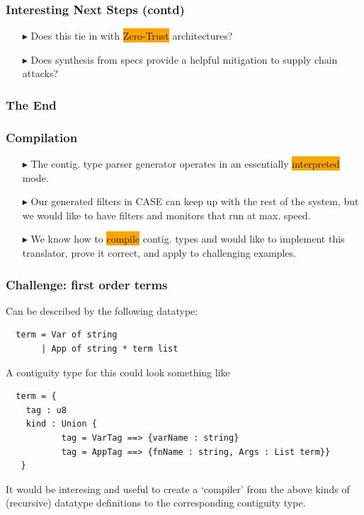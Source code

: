 \documentclass{beamer}
\newcommand{\kemph}[1]{\colorbox{orange}{#1}}
\begin{document}
\begin{frame} \frametitle{Interesting Next Steps (contd)}

\begin{itemize}
\item [$\blacktriangleright$] Does this tie in with \kemph{Zero-Trust} architectures?

\item [$\blacktriangleright$]
  Does synthesis from specs provide a helpful mitigation to supply chain attacks?

\end{itemize}

\end{frame}

\begin{frame}\frametitle{The End}\end{frame}


\begin{frame} \frametitle{Compilation}

\begin{itemize}

\item [$\blacktriangleright$] The contig. type parser generator
  operates in an essentially \kemph{interpreted} mode.

\item [$\blacktriangleright$] Our generated filters in CASE can keep
  up with the rest of the system, but we would like to have filters
  and monitors that run at max. speed.

\item [$\blacktriangleright$] We know how to \kemph{compile}
  contig. types and would like to implement this translator, prove
  it correct, and apply to challenging examples.

\end{itemize}

\end{frame}


\begin{frame}[fragile]\frametitle{Challenge: first order terms}

Can be described by the following datatype:

{\small
\begin{verbatim}
  term = Var of string
       | App of string * term list
\end{verbatim}}

A contiguity type for this could look something like
%
{\small
\begin{verbatim}
  term = {
    tag : u8
    kind : Union {
           tag = VarTag ==> {varName : string}
           tag = AppTag ==> {fnName : string, Args : List term}}
   }
\end{verbatim}}

It would be interesing and useful to create a `compiler' from the
above kinds of (recursive) datatype definitions to the corresponding
contiguity type.

\end{frame}
\end{document}
